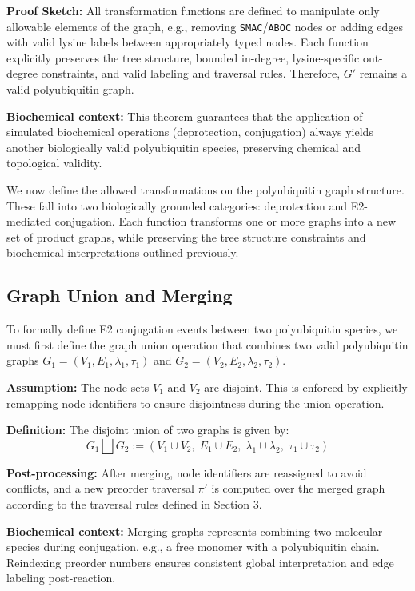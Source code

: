 \documentclass[12pt]{article}
\begin{document}
\vspace{1em}
\textbf{Proof Sketch:} All transformation functions are defined to manipulate only allowable elements of the graph, e.g., removing \texttt{SMAC}/\texttt{ABOC} nodes or adding edges with valid lysine labels between appropriately typed nodes. Each function explicitly preserves the tree structure, bounded in-degree, lysine-specific out-degree constraints, and valid labeling and traversal rules. Therefore, $G'$ remains a valid polyubiquitin graph.

\vspace{1em}
\textbf{Biochemical context:} This theorem guarantees that the application of simulated biochemical operations (deprotection, conjugation) always yields another biologically valid polyubiquitin species, preserving chemical and topological validity.

We now define the allowed transformations on the polyubiquitin graph structure. These fall into two biologically grounded categories: deprotection and E2-mediated conjugation. Each function transforms one or more graphs into a new set of product graphs, while preserving the tree structure constraints and biochemical interpretations outlined previously.


\subsection*{Graph Union and Merging}

To formally define E2 conjugation events between two polyubiquitin species, we must first define the graph union operation that combines two valid polyubiquitin graphs \( G_1 = (V_1, E_1, \lambda_1, \tau_1) \) and \( G_2 = (V_2, E_2, \lambda_2, \tau_2) \).

\textbf{Assumption:} The node sets \( V_1 \) and \( V_2 \) are disjoint. This is enforced by explicitly remapping node identifiers to ensure disjointness during the union operation.

\textbf{Definition:} The disjoint union of two graphs is given by:
\[
G_1 \bigsqcup G_2 := (V_1 \cup V_2,\; E_1 \cup E_2,\; \lambda_1 \cup \lambda_2,\; \tau_1 \cup \tau_2)
\]

\textbf{Post-processing:} After merging, node identifiers are reassigned to avoid conflicts, and a new preorder traversal \( \pi' \) is computed over the merged graph according to the traversal rules defined in Section 3.

\textbf{Biochemical context:} Merging graphs represents combining two molecular species during conjugation, e.g., a free monomer with a polyubiquitin chain. Reindexing preorder numbers ensures consistent global interpretation and edge labeling post-reaction.
\end{document}
